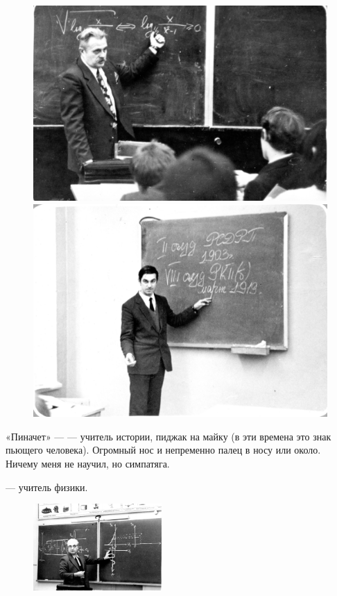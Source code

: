 \documentclass{book}
\begin{document}
\begin{figure}[!ht]
\begin{minipage}{.49\textwidth}
\centering
\includegraphics[scale=.5]{pics/kuksa}
\end{minipage}
\hfill
\begin{minipage}{.49\textwidth}
\centering
\includegraphics[scale=.5]{pics/pinachet}
\end{minipage}
\end{figure}

«Пиначет» ---  --- учитель истории, пиджак на майку
(в эти времена это знак пьющего человека).
Огромный нос и непременно палец в носу или около.
Ничему меня не научил, но симпатяга.

 --- учитель физики.

\begin{figure}
\vskip-4mm
\centering
\includegraphics[width=49mm,angle=0]{pics/slutzkij}
\end{figure}
\end{document}
